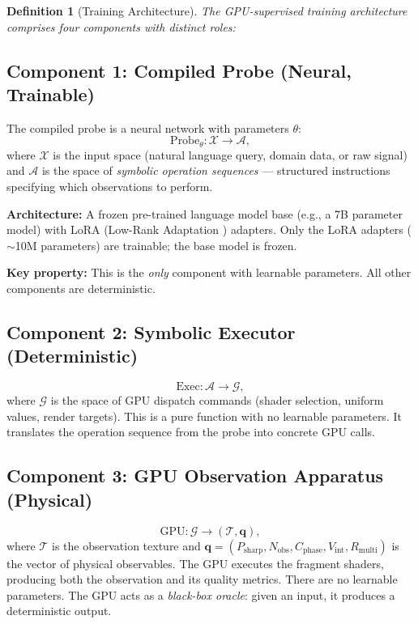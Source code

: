 \documentclass[11pt,twocolumn,a4paper]{article}
\newtheorem{definition}[theorem]{Definition}
\newcommand{\Tex}{\mathcal{T}}
\begin{document}
\begin{definition}[Training Architecture]
\label{def:training-arch}
The GPU-supervised training architecture comprises four components
with distinct roles:
\end{definition}

\subsection{Component 1: Compiled Probe (Neural, Trainable)}

The compiled probe is a neural network with parameters $\theta$:
\begin{equation}
\text{Probe}_\theta : \mathcal{X} \to \mathcal{A},
\label{eq:probe}
\end{equation}
where $\mathcal{X}$ is the input space (natural language query,
domain data, or raw signal) and $\mathcal{A}$ is the space of
\emph{symbolic operation sequences} --- structured instructions
specifying which observations to perform.

\textbf{Architecture:} A frozen pre-trained language model base
(e.g., a 7B parameter model) with LoRA (Low-Rank Adaptation
\citep{hu2022}) adapters. Only the LoRA adapters ($\sim$10M
parameters) are trainable; the base model is frozen.

\textbf{Key property:} This is the \emph{only} component with
learnable parameters. All other components are deterministic.

\subsection{Component 2: Symbolic Executor (Deterministic)}

\begin{equation}
\text{Exec} : \mathcal{A} \to \mathcal{G},
\label{eq:executor}
\end{equation}
where $\mathcal{G}$ is the space of GPU dispatch commands (shader
selection, uniform values, render targets). This is a pure function
with no learnable parameters. It translates the operation sequence
from the probe into concrete GPU calls.

\subsection{Component 3: GPU Observation Apparatus (Physical)}

\begin{equation}
\text{GPU} : \mathcal{G} \to (\Tex, \bm{q}),
\label{eq:gpu-apparatus}
\end{equation}
where $\Tex$ is the observation texture and $\bm{q} = (P_{\mathrm{sharp}},
N_{\mathrm{obs}}, C_{\mathrm{phase}}, V_{\mathrm{int}},
R_{\mathrm{multi}})$ is the vector of physical observables. The GPU
executes the fragment shaders, producing both the observation and
its quality metrics. There are no learnable parameters. The GPU
acts as a \emph{black-box oracle}: given an input, it produces a
deterministic output.
\end{document}

